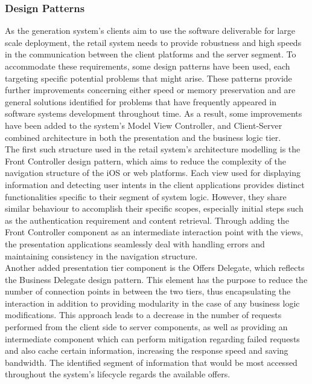 \subsubsection{Design Patterns}

As the generation system's clients aim to use the software deliverable for large scale deployment, the retail system needs to provide robustness and high speeds in the communication between the client platforms and the server segment. To accommodate these requirements, some design patterns have been used, each targeting specific potential problems that might arise. These patterns provide further improvements concerning either speed or memory preservation and are general solutions identified for problems that have frequently appeared in software systems development throughout time. As a result, some improvements have been added to the system's Model View Controller, and Client-Server combined architecture in both the presentation and the business logic tier.\\

The first such structure used in the retail system's architecture modelling is the Front Controller design pattern, which aims to reduce the complexity of the navigation structure of the iOS or web platforms. Each view used for displaying information and detecting user intents in the client applications provides distinct functionalities specific to their segment of system logic. However, they share similar behaviour to accomplish their specific scopes, especially initial steps such as the authentication requirement and content retrieval. Through adding the Front Controller component as an intermediate interaction point with the views, the presentation applications seamlessly deal with handling errors and maintaining consistency in the navigation structure.\\

Another added presentation tier component is the Offers Delegate, which reflects the Business Delegate design pattern. This element has the purpose to reduce the number of connection points in between the two tiers, thus encapsulating the interaction in addition to providing modularity in the case of any business logic modifications. This approach leads to a decrease in the number of requests performed from the client side to server components, as well as providing an intermediate component which can perform mitigation regarding failed requests and also cache certain information, increasing the response speed and saving bandwidth. The identified segment of information that would be most accessed throughout the system's lifecycle regards the available offers.\\

